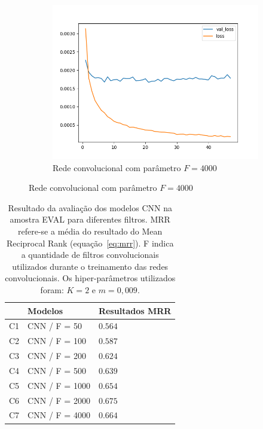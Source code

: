 \begin{figure}[p]
\begin{subfigure}{.5\textwidth}
  \label{fig:cnn-2000-k-2}
\end{subfigure}
\begin{subfigure}{.5\textwidth}
  \centering
  \caption{Rede convolucional com parâmetro $F = 4000$}
  \includegraphics[width=.8\linewidth]{figuras/ape-ajustes-hiper-parametros/cnn-4000-k-2.png}
  
  \label{fig:cnn-4000-k-2}
\end{subfigure}
\label{fig:treinamento-cnn-k-2-m-0009}
\end{figure}


\begin{table}[H]
\centering
\caption[Resultado da avaliação dos modelos CNN na amostra EVAL para diferentes filtros.]{Resultado da avaliação dos modelos CNN na amostra EVAL para diferentes filtros. MRR refere-se a média do resultado do Mean Reciprocal Rank (equação~\ref{eq:mrr}). F indica a quantidade de filtros convolucionais utilizados durante o treinamento das redes convolucionais. Os hiper-parâmetros utilizados foram: $K = 2$ e  $m = 0,009$.}
\begin{tabular}{ p{1cm} p{4cm} P{4cm} }
 \hline
   & Modelos & \textbf{Resultados MRR}\\
 \hline

 C1 & CNN / F = 50 &  $0.564$\\
 
 C2 & CNN / F = 100 &  $0.587$\\
 
 C3 & CNN / F = 200 &  $0.624$\\
 
 C4 & CNN / F = 500 &  $0.639$\\
 
 C5 & CNN / F = 1000 &  $0.654$\\
 
 C6 & CNN / F = 2000 &  $0.675$\\
 
 C7 & CNN / F = 4000 &  $0.664$\\
 
\hline
\end{tabular}
\label{table:cnn-filtros}
\end{table}

